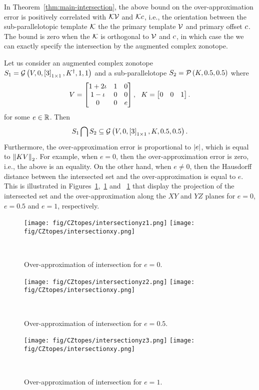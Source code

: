 %
In Theorem~\ref{thm:main-intersection}, the above bound on the over-approximation error is positively
correlated with
$\mathcal{K}\mathcal{V}$ and $\mathcal{K}c$, i.e., the orientation between the
sub-parallelotopic template $\mathcal{K}$ the the primary template $\mathcal{V}$
and primary offset $c$.  The bound is zero when the $\mathcal{K}$ is orthogonal to
$\mathcal{V}$ and $c$, in which case the we can exactly specify the
intersection by the augmented complex zonotope.
%
\begin{example}
Let us consider an augmented complex zonotope\\
${S_1=\mathcal{G}\left(V,0,\left[3\right]_{1\times 1},{K}^\dagger,1,1\right)}$ and a
sub-parallelotope $S_2=\mathcal{P}\left(K,0.5,0.5\right)$ where
%
\[
V = \left[\begin{matrix}
1+2\iota & 1 & 0\\
1-\iota & 0 & 0\\
0 & 0 & e
\end{matrix}\right],~~
K = \left[\begin{matrix}0 & 0 & 1\end{matrix}\right].
\]
%
for some $e\in \mathbb{R}$.  Then
%
\[
S_1\bigcap S_2\subseteq \mathcal{G}\left(V,0,\left[3\right]_{1\times 1},K,0.5,0.5\right).
\]
%
Furthermore, the over-approximation error is proportional to
$\left|e\right|$, which is equal to $\left\|KV\right\|_2$.  For example, when
$e=0$, then the over-approximation error is zero, i.e., the above is
an equality.  On the other hand, when $e\neq 0$, then the Hausdorff
distance between the intersected set and the over-approximation is
equal to $e$.  This is illustrated in
Figures~\ref{fig:overapp1},~\ref{fig:overapp1} and ~\ref{fig:overapp1}
that display the projection of the intersected set and the
over-approximation along the $XY$ and $YZ$ planes for ${e=0}$, $e=0.5$
and $e=1$, respectively.
\end{example}
%
%
\begin{figure}
\center
\texttt{[image: fig/CZtopes/intersectionyz1.png]}
\texttt{[image: fig/CZtopes/intersectionxy.png]}
\caption{Over-approximation of intersection for $e=0$.}~\label{fig:overapp1}
\end{figure}
%
%
\begin{figure}
\center
\texttt{[image: fig/CZtopes/intersectionyz2.png]}
\texttt{[image: fig/CZtopes/intersectionxy.png]}
\caption{Over-approximation of intersection for $e=0.5$.}~\label{fig:overapp2}
\end{figure}
%
\begin{figure}
\center
\texttt{[image: fig/CZtopes/intersectionyz3.png]}
\texttt{[image: fig/CZtopes/intersectionxy.png]}
\caption{Over-approximation of intersection for $e=1$.}~\label{fig:overapp3}
\end{figure}
%
